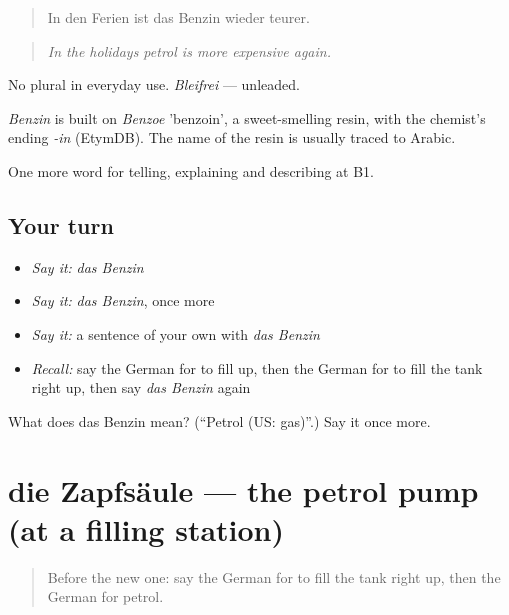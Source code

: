 \begin{quote}
In den Ferien ist das Benzin wieder teurer.
\end{quote}

\begin{quote}
\emph{In the holidays petrol is more expensive again.}
\end{quote}

No plural in everyday use. \emph{Bleifrei} — unleaded.

\begin{cousinweb}
\emph{Benzin} is built on \emph{Benzoe} 'benzoin', a sweet-smelling resin, with the chemist's ending \emph{-in} (EtymDB). The name of the resin is usually traced to Arabic.
\end{cousinweb}

\begin{grammarlens}[title={What you've built}]
One more word for telling, explaining and describing at B1.
\end{grammarlens}

\subsection*{Your turn}
\begin{itemize}
\raggedright
  \item \emph{Say it:} \emph{das Benzin}
  \item \emph{Say it:} \emph{das Benzin}, once more
  \item \emph{Say it:} a sentence of your own with \emph{das Benzin}
  \item \emph{Recall:} say the German for to fill up, then the German for to fill the tank right up, then say \emph{das Benzin} again
\end{itemize}

\begin{tcolorbox}[breakable,colback=teal!4,colframe=teal!35!black,title={Before you move on}]
What does das Benzin mean? (\textquotedblleft{}Petrol (US: gas)\textquotedblright{}.) Say it once more.
\end{tcolorbox}
\section[die Zapfsäule]{die Zapfsäule — the petrol pump (at a filling station)}

\label{lesson:GE-C402-zapfsaeule}



\begin{quote}
Before the new one: say the German for to fill the tank right up, then the German for petrol.
\end{quote}

